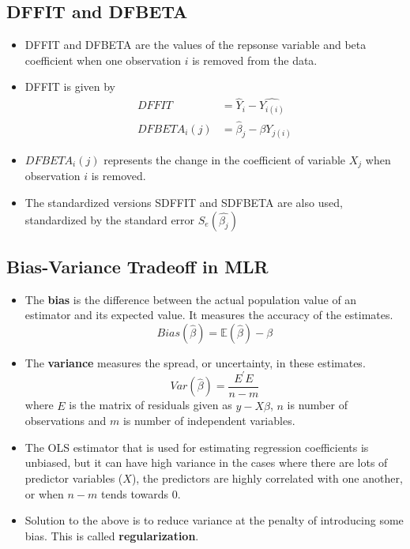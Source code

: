 \documentclass{article}
\theoremstyle{plain}
\theoremstyle{definition}
\begin{document}
\subsection{DFFIT and DFBETA}
\begin{itemize}
    \item DFFIT and DFBETA are the values of the repsonse variable and beta coefficient when one observation $i$ is removed from the data. 
    
    \item DFFIT is given by
    \begin{align*}
        DFFIT &= \hat{Y}_i - \hat{Y_{i(i)}}\\
        DFBETA_i(j) &= \hat{\beta}_j - \beta{Y_{j(i)}}
    \end{align*}
    
    \item $DFBETA_i(j)$ represents the change in the coefficient of variable $X_j$ when observation $i$ is removed. 
    
    \item The standardized versions SDFFIT and SDFBETA are also used, standardized by the standard error $S_e(\hat{\beta_j})$
\end{itemize}

\subsection{Bias-Variance Tradeoff in MLR}
\begin{itemize}
    \item The \textbf{bias} is the difference between the actual population value of an estimator and its expected value. It measures the accuracy of the estimates.
    \begin{equation}
        Bias(\hat{\beta}) = \mathbb{E}(\hat{\beta}) - \beta
    \end{equation}
    
    \item The \textbf{variance} measures the spread, or uncertainty, in these estimates.
    \begin{equation}
        Var(\hat{\beta}) =  \frac{E^{'}E}{n-m}
    \end{equation}
    where $E$ is the matrix of residuals given as $y - X\hat{\beta}$, $n$ is number of observations and $m$ is number of independent variables.
    
    \item The OLS estimator that is used for estimating regression coefficients is unbiased, but it can have high variance in the cases where there are lots of predictor variables ($X$), the predictors are highly correlated with one another, or when $n-m$ tends towards 0. 
    
    \item Solution to the above is to reduce variance at the penalty of introducing some bias. This is called \textbf{regularization}. 
\end{itemize}
\end{document}
